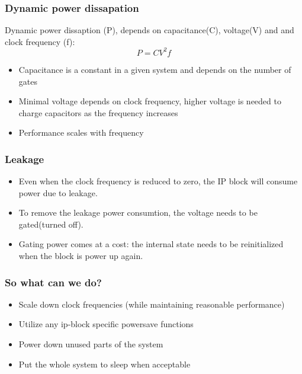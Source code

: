 \documentclass{beamer}
\begin{document}
\begin{frame}
\frametitle{Dynamic power dissapation}

Dynamic power dissaption (P), depends on capacitance(C), voltage(V) and and clock frequency (f):
\[P = CV^2f\]
\begin{itemize}
	\item Capacitance is a constant in a given system and depends on the number of gates
	\item Minimal voltage depends on clock frequency, higher voltage is needed to charge capacitors as the frequency increases
	\item Performance scales with frequency
\end{itemize}
\end{frame}

\begin{frame}
\frametitle{Leakage}
\begin{itemize}
	\item Even when the clock frequency is reduced to zero, the IP block will consume power due to leakage.
	\item To remove the leakage power consumtion, the voltage needs to be gated(turned off).
	\item Gating power comes at a cost: the internal state needs to be reinitialized when the block is power up again.
\end{itemize}
\end{frame}

\begin{frame}
\frametitle{So what can we do?}
\begin{itemize}
	\item Scale down clock frequencies (while maintaining reasonable performance)
	\item Utilize any ip-block specific powersave functions
	\item Power down unused parts of the system
	\item Put the whole system to sleep when acceptable
\end{itemize}
\end{frame}
\end{document}
